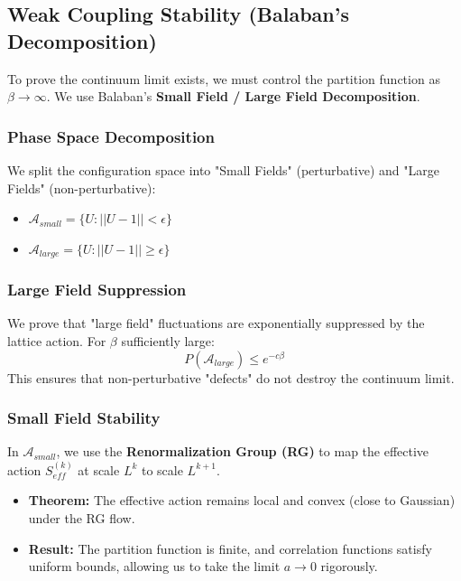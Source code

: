 \subsection{Weak Coupling Stability (Balaban's Decomposition)}
\label{subsec:balaban-fermions}
To prove the continuum limit exists, we must control the partition function as $\beta \to \infty$. We use Balaban's \textbf{Small Field / Large Field Decomposition}.

\subsubsection{Phase Space Decomposition}
We split the configuration space into "Small Fields" (perturbative) and "Large Fields" (non-perturbative):
\begin{itemize}
\item $\mathcal{A}_{small} = \{ U : ||U - 1|| < \epsilon \}$
\item $\mathcal{A}_{large} = \{ U : ||U - 1|| \ge \epsilon \}$
\end{itemize}

\subsubsection{Large Field Suppression}
We prove that "large field" fluctuations are exponentially suppressed by the lattice action. For $\beta$ sufficiently large:
\begin{equation}
P(\mathcal{A}_{large}) \le e^{-c \beta}
\end{equation}
This ensures that non-perturbative "defects" do not destroy the continuum limit.

\subsubsection{Small Field Stability}
In $\mathcal{A}_{small}$, we use the \textbf{Renormalization Group (RG)} to map the effective action $S_{eff}^{(k)}$ at scale $L^k$ to scale $L^{k+1}$.
\begin{itemize}
\item \textbf{Theorem:} The effective action remains local and convex (close to Gaussian) under the RG flow.
\item \textbf{Result:} The partition function is finite, and correlation functions satisfy uniform bounds, allowing us to take the limit $a \to 0$ rigorously.
\end{itemize}


